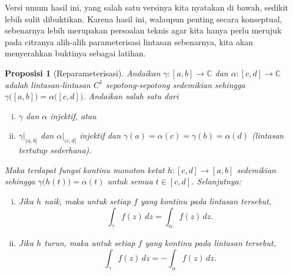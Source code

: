 \documentclass[12pt,openany]{book}
\newcommand{\C}{{\mathbb{C}}}
\theoremstyle{plain}
\newtheorem{prop}[thm]{Proposisi}
\theoremstyle{remark}
\theoremstyle{definition}
\theoremstyle{exercise}
\theoremstyle{example}
\begin{document}
Versi umum hasil ini, yang salah satu versinya kita nyatakan di bawah,
sedikit lebih sulit dibuktikan.
Karena hasil ini, walaupun
penting secara konseptual, sebenarnya lebih merupakan persoalan teknis agar kita hanya perlu
merujuk pada citranya alih-alih parameterisasi lintasan sebenarnya, kita akan
menyerahkan buktinya sebagai latihan.

\begin{prop}[Reparameterisasi]%
\label{prop:reparam}
Andaikan $\gamma \colon [a,b] \to \C$ dan $\alpha \colon [c,d] \to \C$ adalah
lintasan-lintasan $C^1$ sepotong-sepotong sedemikian sehingga
$\gamma\bigl([a,b]\bigr) = \alpha\bigl([c,d]\bigr)$.
Andaikan salah satu dari
\begin{enumerate}[(i)]
\item
$\gamma$ dan $\alpha$ injektif, atau
\item
$\gamma|_{(a,b]}$ dan
$\alpha|_{(c,d]}$ injektif dan
$\gamma(a)=\alpha(c)=\gamma(b)=\alpha(d)$ (lintasan tertutup sederhana).
\end{enumerate}
Maka terdapat fungsi kontinu monoton ketat $h \colon [c,d] \to [a,b]$ sedemikian
sehingga $\gamma\bigl(h(t)\bigr) = \alpha(t)$ untuk semua $t \in [c,d]$.
Selanjutnya:
\begin{enumerate}[(i)]
\item
Jika $h$ naik, maka untuk setiap $f$ yang kontinu pada lintasan tersebut,
\begin{equation*}
\int_\gamma f(z) \, dz = \int_{\alpha} f(z) \, dz .
\end{equation*}
\item
Jika $h$ turun, maka untuk setiap $f$ yang kontinu pada lintasan tersebut,
\begin{equation*}
\int_\gamma f(z) \, dz = - \int_{\alpha} f(z) \, dz .
\end{equation*}
\end{enumerate}
\end{prop}
\end{document}
